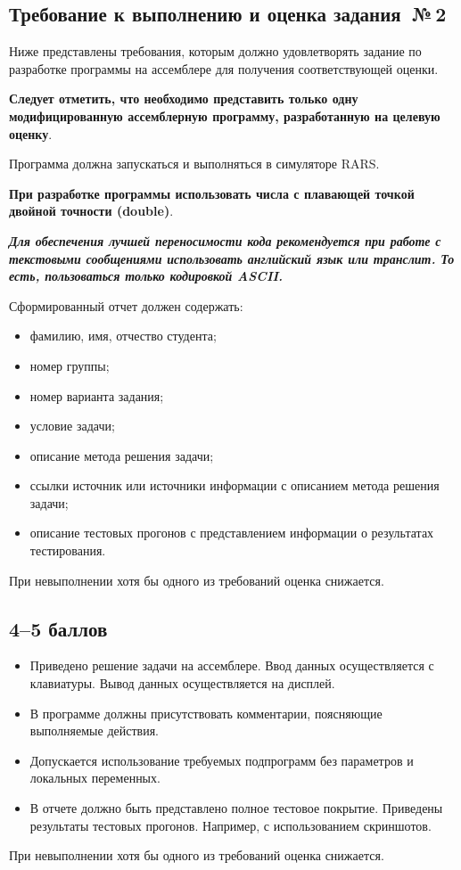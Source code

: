 \documentclass[a4paper, 12pt, oneside]{article}
\begin{document}
\begin{center}
\section*{Требование к выполнению и оценка задания~№\,2}
\end{center}

Ниже представлены требования, которым должно удовлетворять задание по разработке программы на ассемблере для получения соответствующей оценки.

\textbf{Следует отметить, что необходимо представить только одну модифицированную ассемблерную программу, разработанную на целевую оценку}.

Программа должна запускаться и выполняться в симуляторе RARS.

\textbf{При разработке программы использовать числа с плавающей точкой двойной точности (double)}.

\textbf{\textit{Для обеспечения лучшей переносимости кода рекомендуется при работе с текстовыми сообщениями использовать английский язык или транслит. То есть, пользоваться только кодировкой ASCII.}}

Сформированный отчет должен содержать:
\begin{itemize}
    \item фамилию, имя, отчество студента;
    \item номер группы;
    \item номер варианта задания;
    \item условие задачи;
    \item описание метода решения задачи;
    \item ссылки источник или источники информации с описанием метода решения задачи;
    \item описание тестовых прогонов с представлением информации о результатах тестирования.
\end{itemize}
При невыполнении хотя бы одного из требований оценка снижается.

\subsection*{4--5 баллов}

\begin{itemize}
    \item Приведено решение задачи на ассемблере. Ввод данных осуществляется с клавиатуры. Вывод данных осуществляется на дисплей.
    \item В программе должны присутствовать комментарии, поясняющие выполняемые действия.
    \item Допускается использование требуемых подпрограмм без параметров и локальных переменных.
    \item В отчете должно быть представлено полное тестовое покрытие. Приведены результаты тестовых прогонов. Например, с использованием скриншотов.
\end{itemize}
При невыполнении хотя бы одного из требований оценка снижается.
\end{document}
